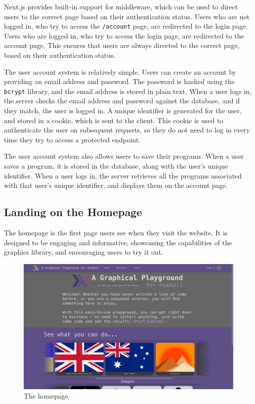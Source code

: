 \documentclass[../main.tex]{subfiles}
\begin{document}
            Next.js provides built-in support for middleware, which can be used to direct
                users to the correct page based on their authentication status.
            Users who are not logged in, who try to access the \texttt{/account} page, are
                redirected to the login page.
            Users who are logged in, who try to access the login page, are redirected to
                the account page.
            This ensures that users are always directed to the correct page, based on their
                authentication status.

            The user account system is relatively simple.
            Users can create an account by providing an email address and password.
            The password is hashed using the \texttt{bcrypt} library, and the email address
                is stored in plain text.
            When a user logs in, the server checks the email address and password against
                the database, and if they match, the user is logged in.
            A unique identifier is generated for the user, and stored in a cookie, which is
                sent to the client.
            This cookie is used to authenticate the user on subsequent requests, so they do
                not need to log in every time they try to access a protected endpoint.

            The user account system also allows users to save their programs.
            When a user saves a program, it is stored in the database, along with the
                user's unique identifier.
            When a user logs in, the server retrieves all the programs associated with that
                user's unique identifier, and displays them on the account page.

        \subsection{Landing on the Homepage}
            The homepage is the first page users see when they visit the website.
            It is designed to be engaging and informative, showcasing the capabilities of
                the graphics library, and encouraging users to try it out.

            \begin{figure}[H]
                \centering
                \includegraphics[width=0.9\linewidth]{images/homepage.png}
                    \caption{The homepage.}
                    \label{fig:homepage}
            \end{figure}
\end{document}
